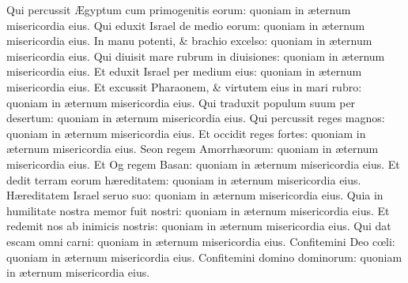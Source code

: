 \documentclass[a5paper,10pt]{book}
\def\ae{æ}
\def\AE{Æ}
\def\oe{œ}
\begin{document}
\begin{multicols*}{2}
\newline \color{red} Q\color{black}ui percussit \AE gyptum cum primogenitis eorum: quoniam in \ae ternum misericordia eius.
\newline \color{red} Q\color{black}ui eduxit Israel de medio eorum: quoniam in \ae ternum misericordia eius.
\newline \color{red} I\color{black}n manu potenti, \& brachio excelso: quoniam in \ae ternum misericordia eius.
\newline \color{red} Q\color{black}ui diuisit mare rubrum in diuisiones: quoniam in \ae ternum misericordia eius.
\newline \color{red} E\color{black}t eduxit Israel per medium eius: quoniam in \ae ternum misericordia eius.
\newline \color{red} E\color{black}t excussit Pharaonem, \& virtutem eius in mari rubro: quoniam in \ae ternum misericordia eius.
\newline \color{red} Q\color{black}ui traduxit populum suum per desertum: quoniam in \ae ternum misericordia eius.
\newline \color{red} Q\color{black}ui percussit reges magnos: quoniam in \ae ternum misericordia eius.
\newline \color{red} E\color{black}t occidit reges fortes: quoniam in \ae ternum misericordia eius.
\newline \color{red} S\color{black}eon regem Amorrh\ae orum: quoniam in \ae ternum misericordia eius.
\newline \color{red} E\color{black}t Og regem Basan: quoniam in \ae ternum misericordia eius.
\newline \color{red} E\color{black}t dedit terram eorum h\ae reditatem: quoniam in \ae ternum misericordia eius.
\newline \color{red} H\color{black}\ae reditatem Israel seruo suo: quoniam in \ae ternum misericordia eius.
\newline \color{red} Q\color{black}uia in humilitate nostra memor fuit nostri: quoniam in \ae ternum misericordia eius.
\newline \color{red} E\color{black}t redemit nos ab inimicis nostris: quoniam in \ae ternum misericordia eius.
\newline \color{red} Q\color{black}ui dat escam omni carni: quoniam in \ae ternum misericordia eius.
\newline \color{red} C\color{black}onfitemini Deo c\oe li: quoniam in \ae ternum misericordia eius.
\newline \color{red} C\color{black}onfitemini domino dominorum: quoniam in \ae ternum misericordia eius.

\end{multicols*}
\end{document}
